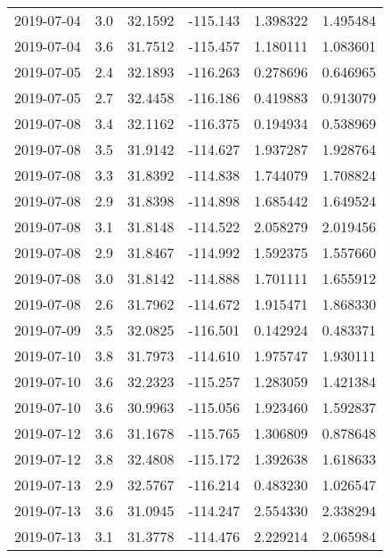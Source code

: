 \begin{tabular}{lrrrrr}
2019-07-04 &       3.0 &  32.1592 &  -115.143 &         1.398322 &         1.495484 \\
2019-07-04 &       3.6 &  31.7512 &  -115.457 &         1.180111 &         1.083601 \\
2019-07-05 &       2.4 &  32.1893 &  -116.263 &         0.278696 &         0.646965 \\
2019-07-05 &       2.7 &  32.4458 &  -116.186 &         0.419883 &         0.913079 \\
2019-07-08 &       3.4 &  32.1162 &  -116.375 &         0.194934 &         0.538969 \\
2019-07-08 &       3.5 &  31.9142 &  -114.627 &         1.937287 &         1.928764 \\
2019-07-08 &       3.3 &  31.8392 &  -114.838 &         1.744079 &         1.708824 \\
2019-07-08 &       2.9 &  31.8398 &  -114.898 &         1.685442 &         1.649524 \\
2019-07-08 &       3.1 &  31.8148 &  -114.522 &         2.058279 &         2.019456 \\
2019-07-08 &       2.9 &  31.8467 &  -114.992 &         1.592375 &         1.557660 \\
2019-07-08 &       3.0 &  31.8142 &  -114.888 &         1.701111 &         1.655912 \\
2019-07-08 &       2.6 &  31.7962 &  -114.672 &         1.915471 &         1.868330 \\
2019-07-09 &       3.5 &  32.0825 &  -116.501 &         0.142924 &         0.483371 \\
2019-07-10 &       3.8 &  31.7973 &  -114.610 &         1.975747 &         1.930111 \\
2019-07-10 &       3.6 &  32.2323 &  -115.257 &         1.283059 &         1.421384 \\
2019-07-10 &       3.6 &  30.9963 &  -115.056 &         1.923460 &         1.592837 \\
2019-07-12 &       3.6 &  31.1678 &  -115.765 &         1.306809 &         0.878648 \\
2019-07-12 &       3.8 &  32.4808 &  -115.172 &         1.392638 &         1.618633 \\
2019-07-13 &       2.9 &  32.5767 &  -116.214 &         0.483230 &         1.026547 \\
2019-07-13 &       3.6 &  31.0945 &  -114.247 &         2.554330 &         2.338294 \\
2019-07-13 &       3.1 &  31.3778 &  -114.476 &         2.229214 &         2.065984 \\

\end{tabular}
